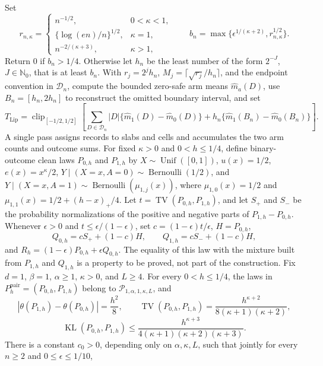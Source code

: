 Set
\[
r_{n,\kappa}=
\begin{cases}
n^{-1/2},&0<\kappa<1,\\
\{\log(en)/n\}^{1/2},&\kappa=1,\\
n^{-2/(\kappa+3)},&\kappa>1,
\end{cases}
\qquad
b_n=\max\{\epsilon^{1/(\kappa+2)},r_{n,\kappa}^{1/2}\}.
\]
Return \(0\) if \(b_n>1/4\). Otherwise let \(h_n\) be the least number of the form \(2^{-J}\), \(J\in\mathbb N_0\), that is at least \(b_n\). With \(r_j=2^jh_n\), \(M_j=\lceil\sqrt{r_j}/h_n\rceil\), and the endpoint convention in \(\mathcal D_n\), compute the bounded zero-safe arm means \(\widehat m_a(D)\), use \(B_n=[h_n,2h_n]\) to reconstruct the omitted boundary interval, and set
\[
T_{\mathrm{Lip}}=\operatorname{clip}_{[-1/2,1/2]}
\left[
\sum_{D\in\mathcal D_n}|D|\{\widehat m_1(D)-\widehat m_0(D)\}
+h_n\{\widehat m_1(B_n)-\widehat m_0(B_n)\}
\right].
\]
A single pass assigns records to slabs and cells and accumulates the two arm counts and outcome sums.
For fixed \(\kappa>0\) and \(0<h\leq1/4\), define binary-outcome clean laws \(P_{0,h}\) and \(P_{1,h}\) by \(X\sim\operatorname{Unif}([0,1])\), \(u(x)=1/2\), \(e(x)=x^\kappa/2\), \(Y\mid(X=x,A=0)\sim\operatorname{Bernoulli}(1/2)\), and \(Y\mid(X=x,A=1)\sim\operatorname{Bernoulli}(\mu_{1,j}(x))\), where \(\mu_{1,0}(x)=1/2\) and \(\mu_{1,1}(x)=1/2+(h-x)_+/4\). Let \(t=\operatorname{TV}(P_{0,h},P_{1,h})\), and let \(S_+\) and \(S_-\) be the probability normalizations of the positive and negative parts of \(P_{1,h}-P_{0,h}\). Whenever \(\epsilon>0\) and \(t\leq\epsilon/(1-\epsilon)\), set \(c=(1-\epsilon)t/\epsilon\), \(H=P_{0,h}\),
\[
Q_{0,h}=cS_++(1-c)H,
\qquad
Q_{1,h}=cS_-+(1-c)H,
\]
and \(R_h=(1-\epsilon)P_{0,h}+\epsilon Q_{0,h}\). The equality of this law with the mixture built from \(P_{1,h}\) and \(Q_{1,h}\) is a property to be proved, not part of the construction.
Fix \(d=1\), \(\beta=1\), \(\alpha\geq1\), \(\kappa>0\), and \(L\geq4\). For every \(0<h\leq1/4\), the laws in \(P_h^{\mathrm{pair}}=(P_{0,h},P_{1,h})\) belong to \(\mathcal P_{1,\alpha,1,\kappa,L}\), and
\[
|\theta(P_{1,h})-\theta(P_{0,h})|=\frac{h^2}{8},
\qquad
\operatorname{TV}(P_{0,h},P_{1,h})
=\frac{h^{\kappa+2}}{8(\kappa+1)(\kappa+2)},
\]
\[
\operatorname{KL}(P_{0,h},P_{1,h})
\leq\frac{h^{\kappa+3}}
{4(\kappa+1)(\kappa+2)(\kappa+3)}.
\]
There is a constant \(c_0>0\), depending only on \(\alpha,\kappa,L\), such that jointly for every \(n\geq2\) and \(0\leq\epsilon\leq1/10\),
